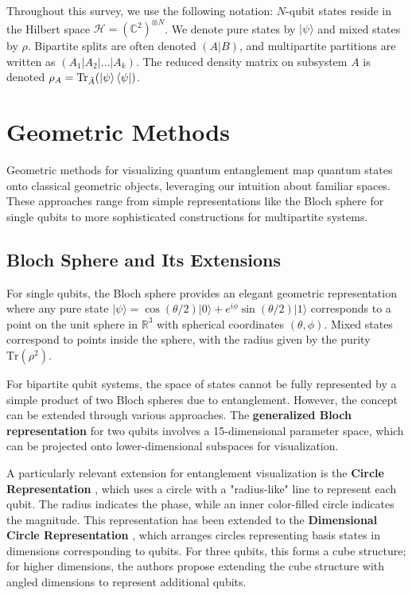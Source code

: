 \documentclass[12pt,a4paper]{article}
\begin{document}
Throughout this survey, we use the following notation: $N$-qubit states reside in the Hilbert space $\mathcal{H} = (\mathbb{C}^2)^{\otimes N}$. We denote pure states by $|\psi\rangle$ and mixed states by $\rho$. Bipartite splits are often denoted $(A|B)$, and multipartite partitions are written as $(A_1|A_2|\ldots|A_k)$. The reduced density matrix on subsystem $A$ is denoted $\rho_A = \text{Tr}_{\bar{A}}(\ket{\psi}\bra{\psi})$.

\section{Geometric Methods}
\label{sec:geometric}

Geometric methods for visualizing quantum entanglement map quantum states onto classical geometric objects, leveraging our intuition about familiar spaces. These approaches range from simple representations like the Bloch sphere for single qubits to more sophisticated constructions for multipartite systems.

\subsection{Bloch Sphere and Its Extensions}
\label{sec:bloch}

For single qubits, the Bloch sphere provides an elegant geometric representation where any pure state $|\psi\rangle = \cos(\theta/2)|0\rangle + e^{i\phi}\sin(\theta/2)|1\rangle$ corresponds to a point on the unit sphere in $\mathbb{R}^3$ with spherical coordinates $(\theta, \phi)$. Mixed states correspond to points inside the sphere, with the radius given by the purity $\text{Tr}(\rho^2)$.

For bipartite qubit systems, the space of states cannot be fully represented by a simple product of two Bloch spheres due to entanglement. However, the concept can be extended through various approaches. The \textbf{generalized Bloch representation} for two qubits involves a 15-dimensional parameter space, which can be projected onto lower-dimensional subspaces for visualization.

A particularly relevant extension for entanglement visualization is the \textbf{Circle Representation} \cite{circle-rep}, which uses a circle with a "radius-like" line to represent each qubit. The radius indicates the phase, while an inner color-filled circle indicates the magnitude. This representation has been extended to the \textbf{Dimensional Circle Representation} \cite{dimensional-circle}, which arranges circles representing basis states in dimensions corresponding to qubits. For three qubits, this forms a cube structure; for higher dimensions, the authors propose extending the cube structure with angled dimensions to represent additional qubits.
\end{document}
